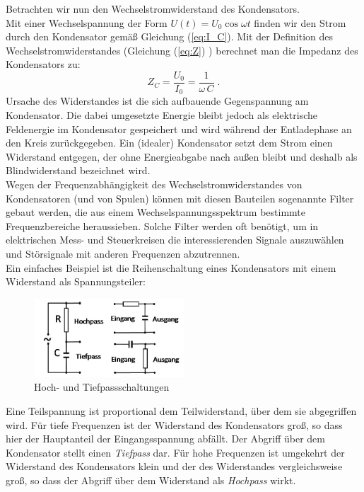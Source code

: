 Betrachten wir nun den Wechselstromwiderstand des Kondensators.\\
Mit einer Wechselspannung der Form $U(t) =  U_0\cos\omega t$ finden wir den Strom durch den Kondensator gemäß Gleichung (\ref{eq:I_C}). Mit der Definition des Wechselstromwiderstandes (Gleichung (\ref{eq:Z}) ) berechnet man die Impedanz des Kondensators zu:
\begin{equation}
 Z_C = \frac{U_0}{I_0} = \frac{1}{\omega\, C}\; .
\end{equation}
Ursache des Widerstandes ist die sich aufbauende Gegenspannung am Kondensator. Die dabei umgesetzte Energie bleibt jedoch als elektrische Feldenergie im Kondensator gespeichert und wird während der Entladephase an den Kreis zurückgegeben. Ein (idealer) Kondensator setzt dem Strom einen Widerstand entgegen, der ohne Energieabgabe nach außen bleibt und deshalb als Blindwiderstand bezeichnet wird.\\

Wegen der Frequenzabhängigkeit des Wechselstromwiderstandes von Kondensatoren (und von Spulen) können mit diesen Bauteilen sogenannte Filter gebaut werden, die aus einem Wechselspannungsspektrum bestimmte Frequenzbereiche heraussieben. Solche Filter werden oft benötigt, um in elektrischen Mess- und Steuerkreisen die interessierenden Signale auszuwählen und Störsignale mit anderen Frequenzen abzutrennen. \\
Ein einfaches Beispiel ist die Reihenschaltung eines Kondensators mit einem Widerstand als Spannungsteiler:
\begin{figure}[ht]
	\centering
		\includegraphics[width=0.5\textwidth]{Abbildungen/Paesse_gross.jpg}
	\caption{Hoch- und Tiefpassschaltungen}
	\label{fig:Hoch-Tiefpass}
\end{figure}
Eine Teilspannung ist proportional dem Teilwiderstand, über dem sie abgegriffen wird. Für tiefe Frequenzen ist der Widerstand des Kondensators groß, so dass hier der Hauptanteil der Eingangsspannung abfällt. Der Abgriff über dem Kondensator stellt einen \textit{Tiefpass} dar. Für hohe Frequenzen ist umgekehrt der Widerstand des Kondensators klein und der des Widerstandes vergleichsweise groß, so dass der Abgriff über dem Widerstand als \textit{Hochpass} wirkt.
